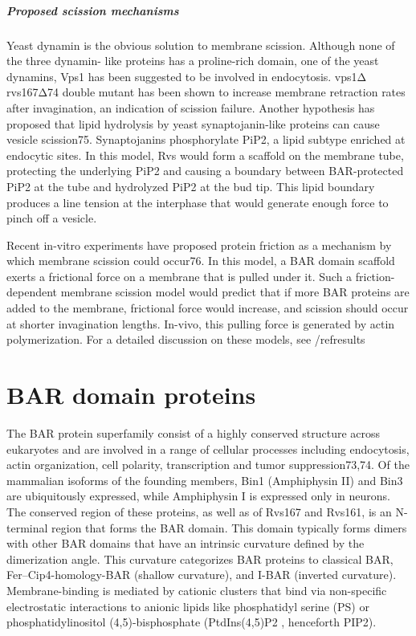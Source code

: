 			\subparagraph{Proposed scission mechanisms}
			Yeast dynamin is the obvious solution to membrane scission. Although none of the three dynamin- like proteins has a proline-rich domain, one of the yeast dynamins, Vps1 has been suggested to be involved in endocytosis. vps1Δ rvs167Δ74 double mutant has been shown to increase membrane retraction rates after invagination, an indication of scission failure. Another hypothesis has proposed that lipid hydrolysis by yeast synaptojanin-like proteins can cause vesicle scission75. Synaptojanins phosphorylate PiP2, a lipid subtype enriched at endocytic sites. In this model, Rvs would form a scaffold on the membrane tube, protecting the underlying PiP2 and causing a boundary between BAR-protected PiP2 at the tube and hydrolyzed PiP2 at the bud tip. This lipid boundary produces a line tension at the interphase that would generate enough force to pinch off a vesicle. 
			
			\vspace{5mm}
			Recent in-vitro experiments have proposed protein friction as a mechanism by which membrane scission could occur76. In this model, a BAR domain scaffold exerts a frictional force on a membrane that is pulled under it. Such a friction-dependent membrane scission model would predict that if more BAR proteins are added to the membrane, frictional force would increase, and scission should occur at shorter invagination lengths. In-vivo, this pulling force is generated by actin polymerization. For a detailed discussion on these models, see /ref{results}

		
\section{BAR domain proteins}
	
The BAR protein superfamily consist of a highly conserved structure across eukaryotes and are involved in a range of cellular processes including endocytosis, actin organization, cell polarity, transcription and tumor suppression73,74.
Of the mammalian isoforms of the founding members, Bin1 (Amphiphysin II) and Bin3 are ubiquitously expressed, while Amphiphysin I is expressed only in neurons. The conserved region of these proteins, as well as of Rvs167 and Rvs161, is an N-terminal region that forms the BAR domain. This domain typically forms dimers with other BAR domains that have an intrinsic curvature defined by the dimerization angle. This curvature categorizes BAR proteins to classical BAR, Fer–Cip4-homology-BAR (shallow curvature), and I-BAR (inverted curvature). Membrane-binding is mediated by cationic clusters that bind via non-specific electrostatic interactions to anionic lipids like phosphatidyl serine (PS) or phosphatidylinositol (4,5)-bisphosphate (PtdIns(4,5)P2 , henceforth PIP2).

